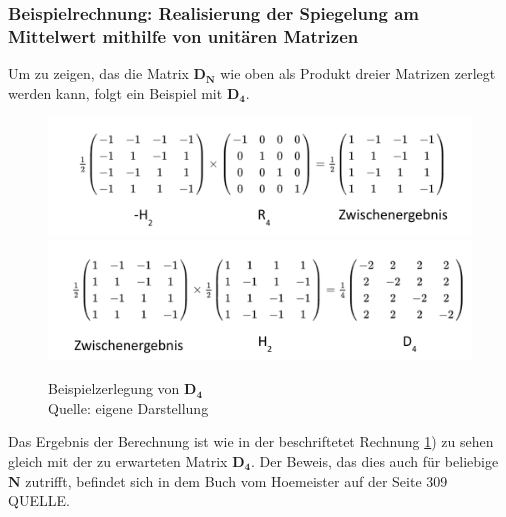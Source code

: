 \subsubsection{Beispielrechnung: Realisierung der Spiegelung am Mittelwert  mithilfe von unitären Matrizen}
Um zu zeigen, das die Matrix $\mathbf{D_N}$ wie oben als Produkt dreier Matrizen zerlegt werden kann, folgt ein Beispiel mit $\mathbf{D_4}$.
\begin{figure}[hbtp]
	\centering
	\includegraphics[width=.8\textwidth]{figures/householderLokal_1.png}
	\includegraphics[width=.8\textwidth]{figures/householderLokal_2.png}
	\caption{Beispielzerlegung von $\mathbf{D_4}$ \\ Quelle: eigene Darstellung}
	\label{fig:DLokal}
\end{figure}
Das Ergebnis der Berechnung ist wie in der beschriftetet Rechnung \ref{fig:DLokal}) zu sehen gleich mit der zu erwarteten Matrix $\mathbf{D_4}$. Der Beweis, das dies auch für beliebige $\mathbf{N}$ zutrifft, befindet sich in dem Buch vom Hoemeister auf der Seite 309 QUELLE.

